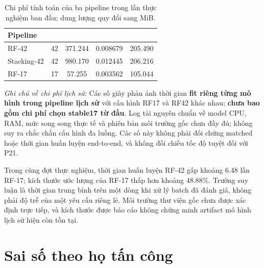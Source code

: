 \begin{table}[htbp]
\centering
\small
\renewcommand{\arraystretch}{1.3}
\setlength{\tabcolsep}{6pt}
\caption{Chi phí tính toán của ba pipeline trong lần thực nghiệm ban đầu; dung lượng quy đổi sang MiB.}
\label{tab:chi-phi}
\begin{tabularx}{\linewidth}{>{\raggedright\arraybackslash}X S[table-format=2.0] S[table-format=4.3] S[table-format=1.6] S[table-format=3.3]}
\toprule
Pipeline & {} & {} & {} & {}\\
\midrule
RF-42 & 42 & 371.244 & 0.008679 & 205.490\\
Stacking-42 & 42 & 980.170 & 0.012445 & 206.216\\
RF-17 & 17 & 57.255 & 0.003562 & 105.044\\
\bottomrule
\end{tabularx}
\par\vspace{4pt}
\begin{minipage}{\linewidth}\footnotesize
\emph{Ghi chú về chi phí lịch sử:} Các số giây phản ánh thời gian \textbf{fit riêng từng mô hình trong pipeline lịch sử} với cấu hình RF17 và RF42 khác nhau; \textbf{chưa bao gồm chi phí chọn stable17 từ đầu}. Log tài nguyên chuẩn về model CPU, RAM, mức song song thực tế và phiên bản môi trường gốc chưa đầy đủ; không suy ra chắc chắn cấu hình đa luồng. Các số này không phải đối chứng matched hoặc thời gian huấn luyện end-to-end, và không đối chiếu tốc độ tuyệt đối với P21.
\end{minipage}
\end{table}

Trong cùng đợt thực nghiệm, thời gian huấn luyện RF-42 gấp khoảng 6.48 lần RF-17; kích thước ước lượng của RF-17 thấp hơn khoảng 48.88\%. Trường suy luận là thời gian trung bình trên một dòng khi xử lý batch đã đánh giá, không phải độ trễ của một yêu cầu riêng lẻ. Môi trường thư viện gốc chưa được xác định trực tiếp, và kích thước được báo cáo không chứng minh artifact mô hình lịch sử hiện còn tồn tại.

\section{Sai số theo họ tấn công}
\label{sec:attack-family-error}

